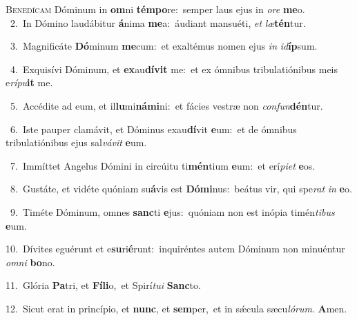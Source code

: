 \lettrine{\initial\textcolor{\initialcolor}{B}}{enedícam} Dóminum in \textbf{om}\-ni \textbf{tém}\-\textbf{po}re:~\star semper laus ejus in \textit{o}\-\textit{re} \textbf{me}\-o.\\
{\numbfont\textcolor{\numbcolor}{~2.}}~In Dómino laudábitur \textbf{á}\-nima \textbf{me}\-a:~\star áudiant mansuéti, \textit{et} \textit{læ}\-\textbf{tén}tur.\par
{\numbfont\textcolor{\numbcolor}{~3.}}~Magnificáte \textbf{Dó}\-minum \textbf{me}\-cum:~\star et exaltémus nomen ejus \textit{in} \textit{id}\-\textbf{íp}sum.\par
{\numbfont\textcolor{\numbcolor}{~4.}}~Exquisívi Dóminum, et \textbf{ex}\-au\-\textbf{dí}\-\textbf{vit} me:~\star et ex ómnibus tribulatiónibus meis e\-\textit{rí}\-\textit{pu}\textbf{it} me.\par
{\numbfont\textcolor{\numbcolor}{~5.}}~Accédite ad eum, et il\-\textbf{lu}\-mi\-\textbf{ná}\-\textbf{mi}ni:~\star et fácies vestræ non \textit{con}\-\textit{fun}\textbf{dén}tur.\par
{\numbfont\textcolor{\numbcolor}{~6.}}~Iste pauper clamávit, et Dóminus exau\-\textbf{dí}\-vit \textbf{e}\-um:~\star et de ómnibus tribulatiónibus ejus sal\-\textit{vá}\-\textit{vit} \textbf{e}\-um.\par
{\numbfont\textcolor{\numbcolor}{~7.}}~Immíttet Angelus Dómini in circúitu ti\-\textbf{mén}\-tium \textbf{e}\-um:~\star et erí\-\textit{pi}\-\textit{et} \textbf{e}\-os.\par
{\numbfont\textcolor{\numbcolor}{~8.}}~Gustáte, et vidéte quóniam su\-\textbf{á}\-vis est \textbf{Dó}\-\textbf{mi}nus:~\star beátus vir, qui spe\textit{rat} \textit{in} \textbf{e}\-o.\par
{\numbfont\textcolor{\numbcolor}{~9.}}~Timéte Dóminum, omnes \textbf{sanc}\-ti \textbf{e}\-jus:~\star quóniam non est inópia timén\-\textit{ti}\-\textit{bus} \textbf{e}\-um.\par
{\numbfont\textcolor{\numbcolor}{10.}}~Dívites eguérunt et e\-\textbf{su}\-ri\-\textbf{é}\-runt:~\star inquiréntes autem Dóminum non minuéntur \textit{om}\-\textit{ni} \textbf{bo}\-no.\par
{\numbfont\textcolor{\numbcolor}{11.}}~Glória \textbf{Pa}\-tri, et \textbf{Fí}\-\textbf{li}o,~\star et Spirí\-\textit{tu}\-\textit{i} \textbf{Sanc}\-to.\par
{\numbfont\textcolor{\numbcolor}{12.}}~Sicut erat in princípio, et \textbf{nunc}\-, et \textbf{sem}\-per,~\star et in sǽcula sæcu\-\textit{ló}\-\textit{rum}. \textbf{A}\-men.\par
